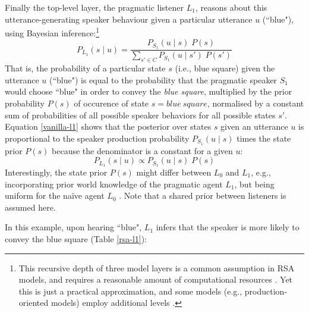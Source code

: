 Finally the top-level layer, the pragmatic listener $L_1$, reasons about this utterance-generating speaker behaviour given a particular utterance $u$ (``blue"), using Bayesian inference:\footnote{This recursive depth of three model layers is a common assumption in RSA models, and requires a reasonable amount of computational resources \parencite{lassiter2017adjectival}. Yet this is just a practical approximation, and some models (e.g., production-oriented models) employ additional levels \parencite{problang}.}
\begin{equation}
\label{vanilla-l1} 
P_{L_1}(s \mid u) = \frac{P_{S_1}(u \mid s) \; P(s)}{\sum_{s' \in C} P_{S_1}(u \mid s') \; P(s')}
\end{equation}
That is, the probability of a particular state $s$ (i.e., blue square) given the utterance $u$ (``blue") is equal to the probability that the pragmatic speaker $S_1$ would choose ``blue" in order to convey the \textit{blue square}, multiplied by the prior probability $P(s)$ of occurence of state $s = blue \:square$, normalised by a constant sum of probabilities of all possible speaker behaviors for all possible states $s'$. 
Equation \ref{vanilla-l1} shows that the posterior over states $s$ given an utterance $u$ is proportional to the speaker production probability $P_{S_1}(u \mid s)$ times the state prior $P(s)$ because the denominator is a constant for a given $u$: 
\begin{equation}
P_{L_1}(s \mid u) \propto P_{S_1}(u \mid s) \; P(s)
\end{equation} 
Interestingly, the state prior $P(s)$ might differ between $L_0$ and $L_1$, e.g., incorporating prior world knowledge of the pragmatic agent $L_1$, but being uniform for the na\"ive agent $L_0$ \parencite{problang}. Note that a shared prior between listeners is assumed here.

In this example, upon hearing ``blue", $L_1$ infers that the speaker is more likely to convey the blue square (Table \ref{rsa-l1}):


